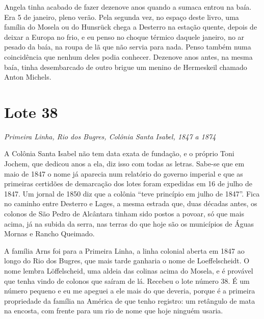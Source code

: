\documentclass[
  brazilian,
  11pt,
  openany]{book}
\begin{document}
Angela tinha acabado de fazer dezenove anos quando a sumaca entrou na
baía. Era 5 de janeiro, pleno verão. Pela segunda vez, no espaço deste
livro, uma família do Mosela ou do Hunsrück chega a Desterro na estação
quente, depois de deixar a Europa no frio, e eu penso no choque térmico
daquele janeiro, no ar pesado da baía, na roupa de lã que não servia
para nada. Penso também numa coincidência que nenhum deles podia
conhecer. Dezenove anos antes, na mesma baía, tinha desembarcado de
outro brigue um menino de Hermeskeil chamado Anton Michels.

\section{Lote 38}\label{lote-38}

\emph{Primeira Linha, Rio dos Bugres, Colônia Santa Isabel, 1847 a 1874}

A Colônia Santa Isabel não tem data exata de fundação, e o próprio Toni
Jochem, que dedicou anos a ela, diz isso com todas as letras. Sabe-se
que em maio de 1847 o nome já aparecia num relatório do governo imperial
e que as primeiras certidões de demarcação dos lotes foram expedidas em
16 de julho de 1847. Um jornal de 1850 diz que a colônia ``teve
princípio em julho de 1847''. Fica no caminho entre Desterro e Lages, a
mesma estrada que, duas décadas antes, os colonos de São Pedro de
Alcântara tinham sido postos a povoar, só que mais acima, já na subida
da serra, nas terras do que hoje são os municípios de Águas Mornas e
Rancho Queimado.

A família Arns foi para a Primeira Linha, a linha colonial aberta em
1847 ao longo do Rio dos Bugres, que mais tarde ganharia o nome de
Loeffelscheidt. O nome lembra Löffelscheid, uma aldeia das colinas acima
do Mosela, e é provável que tenha vindo de colonos que saíram de lá.
Recebeu o lote número 38. É um número pequeno e eu me apeguei a ele mais
do que deveria, porque é a primeira propriedade da família na América de
que tenho registro: um retângulo de mata na encosta, com frente para um
rio de nome que hoje ninguém usaria.
\end{document}
